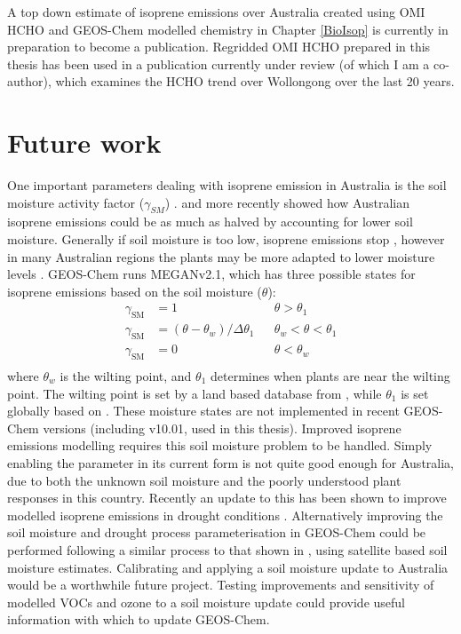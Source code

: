   A top down estimate of isoprene emissions over Australia created using OMI HCHO and GEOS-Chem modelled chemistry in Chapter \ref{BioIsop} is currently in preparation to become a publication.
  Regridded OMI HCHO prepared in this thesis has been used in a publication currently under review (of which I am a co-author), which examines the HCHO trend over Wollongong over the last 20 years.
  
  
\section{Future work}
  \label{Conclusions:futurework}

  One important parameters dealing with isoprene emission in Australia is the soil moisture activity factor ($\gamma_{SM}$) \parencite{Sindelarova2014,Bauwens2016}.
  \textcite{Sindelarova2014} and more recently \textcite{Emmerson2019} showed how Australian isoprene emissions could be as much as halved by accounting for lower soil moisture.
  Generally if soil moisture is too low, isoprene emissions stop \parencite{Pegoraro2004,Niinemets2010}, however in many Australian regions the plants may be more adapted to lower moisture levels \parencite{Emmerson2019}.
  GEOS-Chem runs MEGANv2.1, which has three possible states for isoprene emissions based on the soil moisture ($\theta$):
  \begin{align*}
  \gamma_\mathrm{SM} & = 1 && \theta > \theta_1 \\
  \gamma_\mathrm{SM} & = (\theta-\theta_w)/\Delta\theta_1  && \theta_w < \theta < \theta_1 \\
  \gamma_\mathrm{SM} & = 0 && \theta < \theta_w \\
  \end{align*}
  where $\theta_w$ is the wilting point, and $\theta_1$ determines when plants are near the wilting point.
  The wilting point is set by a land based database from \textcite{Chen2001}, while $\theta_1$ is set globally based on \textcite{Pegoraro2004}.
  These moisture states are not implemented in recent GEOS-Chem versions (including v10.01, used in this thesis).
  Improved isoprene emissions modelling requires this soil moisture problem to be handled.
  Simply enabling the parameter in its current form is not quite good enough for Australia, due to both the unknown soil moisture and the poorly understood plant responses in this country.
  Recently an update to this has been shown to improve modelled isoprene emissions in drought conditions \parencite{Jiang2018}.
  Alternatively improving the soil moisture and drought process parameterisation in GEOS-Chem could be performed following a similar process to that shown in \textcite{Emmerson2019}, using satellite based soil moisture estimates.
  Calibrating and applying a soil moisture update to Australia would be a worthwhile future project.
  Testing improvements and sensitivity of modelled VOCs and ozone to a soil moisture update could provide useful information with which to update GEOS-Chem.
  
